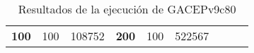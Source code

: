 \begin{table}[H]
\begin{tabular}{|ccrccrccc}
\multicolumn{1}{|c|}{\multirow{-39}{*}{\cellcolor[HTML]{FFFFC7}\textbf{100}}} & \multicolumn{1}{c|}{\multirow{-9}{*}{\cellcolor[HTML]{DDFDFF}100}} & \multicolumn{1}{r|}{\cellcolor[HTML]{DAE8FC}108752}    & \multicolumn{1}{c|}{\multirow{-39}{*}{\cellcolor[HTML]{FFFFC7}\textbf{200}}} & \multicolumn{1}{c|}{\multirow{-10}{*}{\cellcolor[HTML]{DDFDFF}100}} & \multicolumn{1}{r|}{\cellcolor[HTML]{DDFDFF}522567}    &                                                                              &                                                                    &                                                        \\ \cline{1-6}
\end{tabular}
\caption{\label{res:GACEPv9c80}Resultados de la ejecución de GACEPv9c80}
\end{table}

